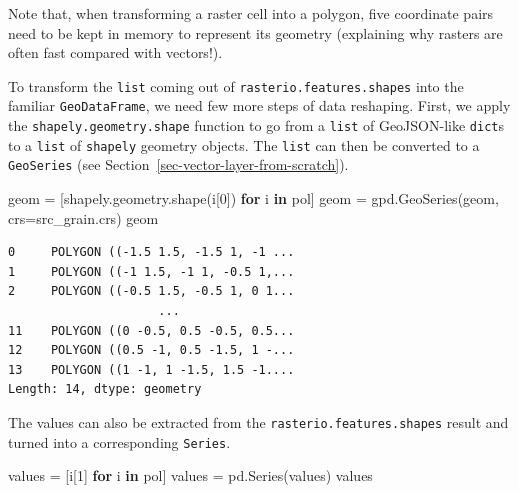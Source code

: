 \documentclass[
  letterpaper,
]{krantz}
\newenvironment{Shaded}{\begin{snugshade}}{\end{snugshade}}
\newcommand{\ControlFlowTok}[1]{\textcolor[rgb]{0.00,0.23,0.31}{\textbf{#1}}}
\newcommand{\DecValTok}[1]{\textcolor[rgb]{0.68,0.00,0.00}{#1}}
\newcommand{\KeywordTok}[1]{\textcolor[rgb]{0.00,0.23,0.31}{\textbf{#1}}}
\newcommand{\NormalTok}[1]{\textcolor[rgb]{0.00,0.23,0.31}{#1}}
\newcommand{\OperatorTok}[1]{\textcolor[rgb]{0.37,0.37,0.37}{#1}}
\begin{document}
\begin{tcolorbox}[enhanced jigsaw, title=\textcolor{quarto-callout-note-color}{\faInfo}\hspace{0.5em}{Note}, arc=.35mm, toprule=.15mm, titlerule=0mm, colframe=quarto-callout-note-color-frame, breakable, toptitle=1mm, bottomtitle=1mm, rightrule=.15mm, colbacktitle=quarto-callout-note-color!10!white, leftrule=.75mm, left=2mm, bottomrule=.15mm, opacityback=0, coltitle=black, opacitybacktitle=0.6, colback=white]

Note that, when transforming a raster cell into a polygon, five
coordinate pairs need to be kept in memory to represent its geometry
(explaining why rasters are often fast compared with vectors!).

\end{tcolorbox}

To transform the \texttt{list} coming out of
\texttt{rasterio.features.shapes} into the familiar
\texttt{GeoDataFrame}, we need few more steps of data reshaping. First,
we apply the \texttt{shapely.geometry.shape} function to go from a
\texttt{list} of GeoJSON-like \texttt{dict}s to a \texttt{list} of
\texttt{shapely} geometry objects. The \texttt{list} can then be
converted to a \texttt{GeoSeries} (see
Section~\ref{sec-vector-layer-from-scratch}).

\begin{Shaded}
\begin{Highlighting}[]
\NormalTok{geom }\OperatorTok{=}\NormalTok{ [shapely.geometry.shape(i[}\DecValTok{0}\NormalTok{]) }\ControlFlowTok{for}\NormalTok{ i }\KeywordTok{in}\NormalTok{ pol]}
\NormalTok{geom }\OperatorTok{=}\NormalTok{ gpd.GeoSeries(geom, crs}\OperatorTok{=}\NormalTok{src\_grain.crs)}
\NormalTok{geom}
\end{Highlighting}
\end{Shaded}

\begin{verbatim}
0     POLYGON ((-1.5 1.5, -1.5 1, -1 ...
1     POLYGON ((-1 1.5, -1 1, -0.5 1,...
2     POLYGON ((-0.5 1.5, -0.5 1, 0 1...
                     ...                
11    POLYGON ((0 -0.5, 0.5 -0.5, 0.5...
12    POLYGON ((0.5 -1, 0.5 -1.5, 1 -...
13    POLYGON ((1 -1, 1 -1.5, 1.5 -1....
Length: 14, dtype: geometry
\end{verbatim}

The values can also be extracted from the
\texttt{rasterio.features.shapes} result and turned into a corresponding
\texttt{Series}.

\begin{Shaded}
\begin{Highlighting}[]
\NormalTok{values }\OperatorTok{=}\NormalTok{ [i[}\DecValTok{1}\NormalTok{] }\ControlFlowTok{for}\NormalTok{ i }\KeywordTok{in}\NormalTok{ pol]}
\NormalTok{values }\OperatorTok{=}\NormalTok{ pd.Series(values)}
\NormalTok{values}
\end{Highlighting}
\end{Shaded}
\end{document}
